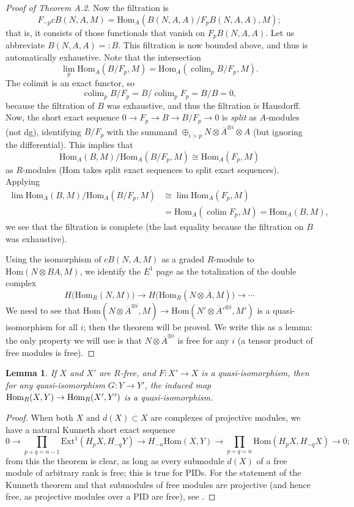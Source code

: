 \documentclass{memo-l}
\DeclareMathOperator{\colim}{colim}
\newtheorem{lemma}[theorem]{Lemma}
\theoremstyle{definition}
\theoremstyle{remark}
\numberwithin{section}{chapter}
\numberwithin{equation}{chapter}
\begin{document}
\begin{proof}[Proof of Theorem A.2]
Now the filtration is $$F_{-p} cB(N,A,M) = \text{Hom}_A(B(N,A,A)/F_p B(N,A,A), M);$$ that is, it consists of those functionals that vanish on $F_p B(N,A,A)$. Let us abbreviate $B(N,A,A) =: B$. This filtration is now bounded above, and thus is automatically exhaustive. Note that the intersection $$\lim_{p} \text{Hom}_A(B/F_p, M) = \text{Hom}_A(\colim_p B/F_p, M).$$ The colimit is an exact functor, so $$\colim_p B/F_p = B/\colim_p F_p = B/B = 0,$$ because the filtration of $B$ was exhaustive, and thus the filtration is Hausdorff. Now, the short exact sequence $0 \to F_p \to B \to B/F_p \to 0$ is \emph{split} as $A$-modules (not dg), identifying $B/F_p$ with the summand $\oplus_{i > p} N \otimes \overline{A}^{\otimes i} \otimes A$ (but ignoring the differential). This implies that 
$$\text{Hom}_A(B, M)\big/\text{Hom}_A(B/F_p, M) \cong \text{Hom}_A(F_p, M)$$ 
as $R$-modules ($\text{Hom}$ takes split exact sequences to split exact sequences). Applying 
\begin{align*}\lim \text{Hom}_A(B, M)\big/\text{Hom}_A(B/F_p, M) &\cong \lim \text{Hom}_A(F_p, M) \\
&= \text{Hom}_A(\colim F_p, M) = \text{Hom}_A(B, M),
\end{align*}
we see that the filtration is complete (the last equality because the filtration on $B$ was exhaustive).

Using the isomorphism of $cB(N,A,M)$ as a graded $R$-module to $\text{Hom}(N \otimes BA, M)$, we identify the $E^1$ page as the totalization of the double complex $$H\big(\text{Hom}_R(N,M)\big) \to H\big(\text{Hom}_R(N \otimes \overline A, M)\big) \to \cdots$$
We need to see that $\text{Hom}(N \otimes \overline A^{\otimes i}, M) \to \text{Hom}(N' \otimes \overline A'^{\otimes i}, M')$ is a quasi-isomorphism for all $i$; then the theorem will be proved. We write this as a lemma: the only property we will use is that $N \otimes \overline A^{\otimes i}$ is free for any $i$ (a tensor product of free modules is free).
\end{proof}

\begin{lemma}If $X$ and $X'$ are $R$-free, and $F: X' \to X$ is a quasi-isomorphism, then for any quasi-isomorphism $G: Y \to Y'$, the induced map $\textup{Hom}_R(X, Y) \to \textup{Hom}_R(X', Y')$ is a quasi-isomorphism.\end{lemma}
\begin{proof}
When both $X$ and $d(X) \subset X$ are complexes of projective modules, we have a natural Kunneth short exact sequence $$0 \to \prod_{p+q = n-1} \text{Ext}^1(H_p X, H_{-q} Y) \to H_{-n} \text{Hom}(X, Y) \to \prod_{p+q = n} \text{Hom}(H_p X, H_{-q} X) \to 0;$$ from this the theorem is clear, as long as every submodule $d(X)$ of a free module of arbitrary rank is free; this is true for PIDs. For the statement of the Kunneth theorem and that submodules of free modules are projective (and hence free, as projective modules over a PID are free), see \cite[Exercises~3.6.1-3.6.2]{weibel1995introduction}.
\end{proof}
\end{document}
